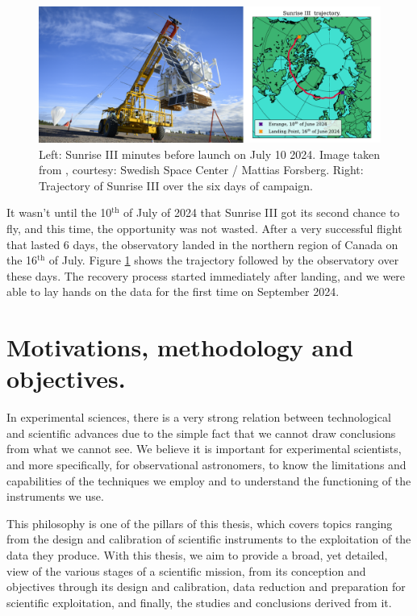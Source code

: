 \begin{figure}[t]
  \centering
  \includegraphics[width = \textwidth]{figures/Introduction/Sunrise.pdf}
  \caption[Sunrise III and its trajectory]{Left: Sunrise III minutes before launch on July 10 2024. Image taken from \cite{SunriseIII}, courtesy: Swedish Space Center / Mattias Forsberg. Right: Trajectory of Sunrise III over the six days of campaign.} 
  \label{fig_intro: sunrise_trajectory}
\end{figure}

It wasn't until the 10$^{\text{th}}$ of July of 2024 that Sunrise III got its second chance to fly, and this time, the opportunity was not wasted. After a very successful flight that lasted 6 days, the observatory landed in the northern region of Canada on the 16$^{\text{th}}$ of July. Figure \ref{fig_intro: sunrise_trajectory} shows the trajectory followed by the observatory over these days. The recovery process started immediately after landing, and we were able to lay hands on the data for the first time on September 2024. 

\section{Motivations, methodology and objectives.}

In experimental sciences, there is a very strong relation between technological and scientific advances due to the simple fact that we cannot draw conclusions from what we cannot see. We believe it is important for experimental scientists, and more specifically, for observational astronomers, to know the limitations and capabilities of the techniques we employ and to understand the functioning of the instruments we use. 

This philosophy is one of the pillars of this thesis, which covers topics ranging from the design and calibration of scientific instruments to the exploitation of the data they produce. With this thesis, we aim to provide a broad, yet detailed, view of the various stages of a scientific mission, from its conception and objectives through its design and calibration, data reduction and preparation for scientific exploitation, and finally, the studies and conclusions derived from it.

